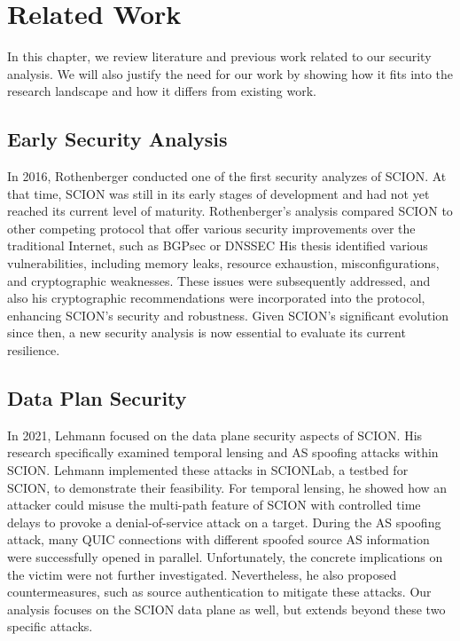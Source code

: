 \chapter{Related Work}
\label{ch:related-work}


In this chapter, we review literature and previous work related to our security analysis.
We will also justify the need for our work by showing how it fits into the research landscape and how it differs from existing work.

\section{Early Security Analysis}
In 2016, Rothenberger \cite{Rothenberger2016} conducted one of the first security analyzes of SCION.
At that time, SCION was still in its early stages of development and had not yet reached its current level of maturity.
Rothenberger's analysis compared SCION to other competing protocol that offer various security improvements over the traditional Internet, such as BGPsec or DNSSEC
His thesis identified various vulnerabilities, including memory leaks, resource exhaustion, misconfigurations, and cryptographic weaknesses.
These issues were subsequently addressed, and also his cryptographic recommendations were incorporated into the protocol, enhancing SCION's security and robustness.
Given SCION's significant evolution since then, a new security analysis is now essential to evaluate its current resilience.

\section{Data Plan Security}
In 2021, Lehmann \cite{Lehmann2021} focused on the data plane security aspects of SCION.
His research specifically examined temporal lensing and AS spoofing attacks within SCION.
Lehmann implemented these attacks in SCIONLab, a testbed for SCION, to demonstrate their feasibility.
For temporal lensing, he showed how an attacker could misuse the multi-path feature of SCION with controlled time delays to provoke a denial-of-service attack on a target.
During the AS spoofing attack, many QUIC connections with different spoofed source AS information were successfully opened in parallel.
Unfortunately, the concrete implications on the victim were not further investigated.
Nevertheless, he also proposed countermeasures, such as source authentication to mitigate these attacks.
Our analysis focuses on the SCION data plane as well, but extends beyond these two specific attacks.


